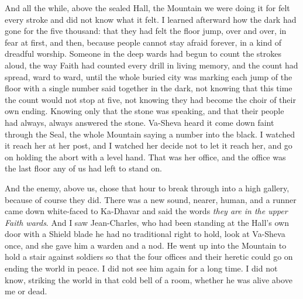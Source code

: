 And all the while, above the sealed Hall, the Mountain we were doing it for felt every stroke and did not know what it felt. I learned afterward how the dark had gone for the five thousand: that they had felt the floor jump, over and over, in fear at first, and then, because people cannot stay afraid forever, in a kind of dreadful worship. Someone in the deep wards had begun to count the strokes aloud, the way Faith had counted every drill in living memory, and the count had spread, ward to ward, until the whole buried city was marking each jump of the floor with a single number said together in the dark, not knowing that this time the count would not stop at five, not knowing they had become the choir of their own ending. Knowing only that the stone was speaking, and that their people had always, always answered the stone. Va-Sheva heard it come down faint through the Seal, the whole Mountain saying a number into the black. I watched it reach her at her post, and I watched her decide not to let it reach her, and go on holding the abort with a level hand. That was her office, and the office was the last floor any of us had left to stand on.\par

And the enemy, above us, chose that hour to break through into a high gallery, because of course they did. There was a new sound, nearer, human, and a runner came down white-faced to Ka-Dhavar and said the words \emph{they are in the upper Faith wards}. And I saw Jean-Charles, who had been standing at the Hall's own door with a Shield blade he had no traditional right to hold, look at Va-Sheva once, and she gave him a warden and a nod. He went up into the Mountain to hold a stair against soldiers so that the four offices and their heretic could go on ending the world in peace. I did not see him again for a long time. I did not know, striking the world in that cold bell of a room, whether he was alive above me or dead.\par

